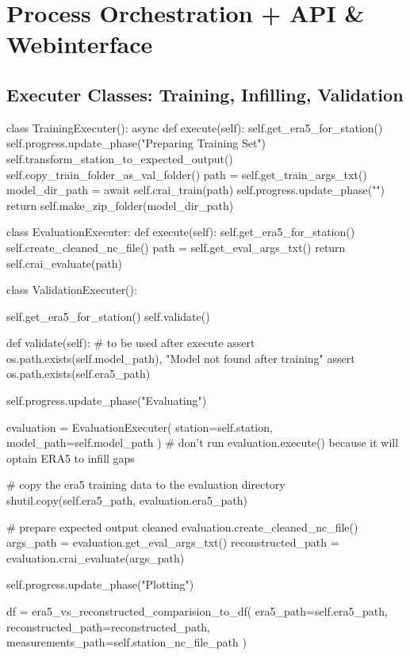 
\section{Process Orchestration + API \& Webinterface}
\label{sec:process_orchestration}
\subsection{Executer Classes: Training, Infilling, Validation}

class TrainingExecuter():
    async def execute(self):
    self.get_era5_for_station()
    self.progress.update_phase("Preparing Training Set")
    self.transform_station_to_expected_output()
    self.copy_train_folder_as_val_folder()
    path = self.get_train_args_txt()
    model_dir_path = await self.crai_train(path)
    self.progress.update_phase("")
    return self.make_zip_folder(model_dir_path)

class EvaluationExecuter:
    def execute(self):
    self.get_era5_for_station()
    self.create_cleaned_nc_file()
    path = self.get_eval_args_txt()
    return self.crai_evaluate(path)  

class ValidationExecuter():

    self.get_era5_for_station()
    self.validate()

    def validate(self):
            # to be used after execute
            assert os.path.exists(self.model_path), "Model not found after training"
            assert os.path.exists(self.era5_path)

            self.progress.update_phase("Evaluating")

            evaluation = EvaluationExecuter(
                station=self.station,
                model_path=self.model_path
            )
            # don't run evaluation.execute() because it will optain ERA5 to infill gaps

            # copy the era5 training data to the evaluation directory
            shutil.copy(self.era5_path, evaluation.era5_path)

            # prepare expected output cleaned
            evaluation.create_cleaned_nc_file()
            args_path = evaluation.get_eval_args_txt()
            reconstructed_path = evaluation.crai_evaluate(args_path)

            self.progress.update_phase("Plotting")

            df = era5_vs_reconstructed_comparision_to_df(
                era5_path=self.era5_path,
                reconstructed_path=reconstructed_path,
                measurements_path=self.station_nc_file_path
            )


